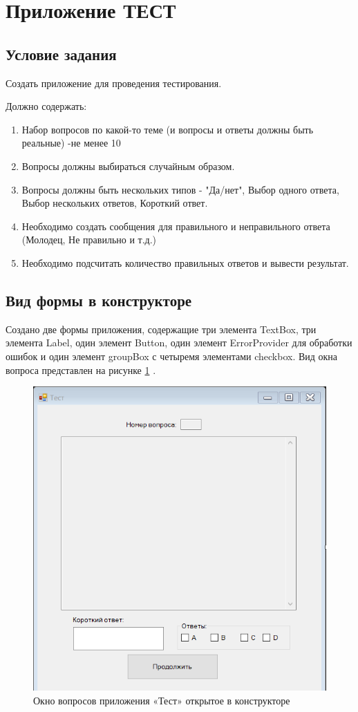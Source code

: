 \section{Приложение ТЕСТ}

\subsection{Условие задания}

Создать приложение для проведения тестирования.

Должно содержать:
\begin{enumerate}
    \item Набор вопросов по какой-то теме (и вопросы и ответы должны быть реальные) -не менее 10
    \item Вопросы должны выбираться случайным образом.
    \item Вопросы должны быть нескольких типов - "Да/нет", Выбор одного ответа, Выбор нескольких ответов, Короткий ответ.
    \item Необходимо создать сообщения для правильного и неправильного ответа (Молодец, Не правильно и т.д.)
    \item Необходимо подсчитать количество правильных ответов и вывести результат.
\end{enumerate}

\subsection{Вид формы в конструкторе}


Создано две формы приложения, содержащие три элемента TextBox, три элемента Label, один элемент Button, один элемент ErrorProvider для обработки ошибок и один элемент groupBox с четыремя элементами checkbox. Вид окна вопроса представлен на рисунке \ref{task9_form1} \cite{зиборов2011ms}.
\begin{figure}[H]
    \centering
    \includegraphics[width=0.8\linewidth]{lections/img/task9_form1.png}
    \caption{Окно вопросов приложения «Тест» открытое в конструкторе}
    \label{task9_form1}
\end{figure}

